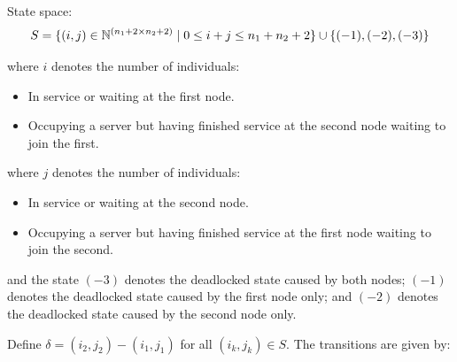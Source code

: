 \documentclass{article}
\numberwithin{equation}{section}
\begin{document}
State space:
    \[S = \{(i,j)\in\mathbb{N}^{(n_1+2\times n_2+2)} \nonscript\; | \nonscript\; 0 \leq i + j \leq n_1 + n_2 + 2
    \}\cup\{(-1), (-2), (-3)\}\]

    where \(i\) denotes the number of individuals:
        \begin{itemize}
            \item In service or waiting at the first node.
            \item Occupying a server but having finished service at the
                second node waiting to join the first.
        \end{itemize}
    where \(j\) denotes the number of individuals:
        \begin{itemize}
            \item In service or waiting at the second node.
            \item Occupying a server but having finished service at the
                first node waiting to join the second.
        \end{itemize}
    and the state $(-3)$ denotes the deadlocked state caused by both nodes; $(-1)$ denotes the deadlocked state caused by the first node only; and $(-2)$ denotes the deadlocked state caused by the second node only.

Define $\delta = (i_2, j_2) - (i_1, j_1)$ for all $(i_k, j_k) \in S$. The transitions are given by:
\end{document}
